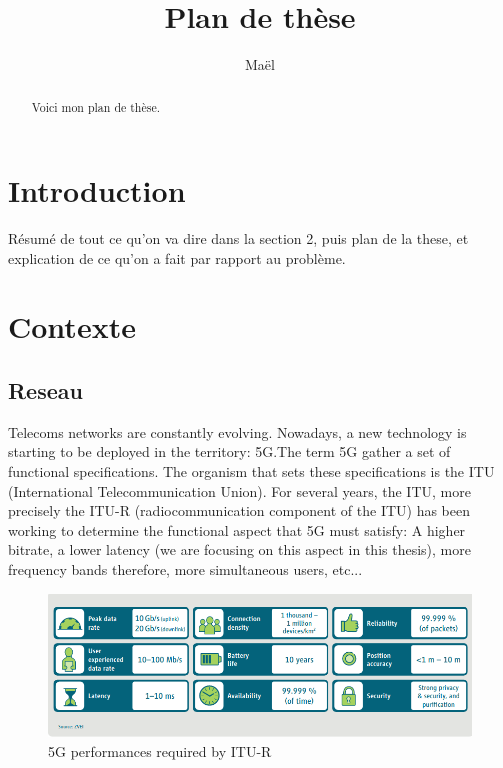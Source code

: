 \documentclass[a4paper,10pt]{article}
\title{Plan de thèse}
\author{Maël}
\begin{document}
\maketitle

\begin{abstract}
Voici mon plan de thèse.
\end{abstract}
\section{Introduction}
Résumé  de tout ce qu'on va dire dans la section 2, puis plan de la these, et explication de ce qu'on a fait par rapport au problème.

\section{Contexte}

\subsection{Reseau}
Telecoms networks are constantly evolving. Nowadays, a new technology is starting to be deployed in the territory: 5G.The term 5G gather a set of functional specifications. The organism that sets these specifications is the ITU (International Telecommunication Union). For several years, the ITU, more precisely the ITU-R (radiocommunication component of the ITU) has been working to determine the functional aspect that 5G must satisfy: A higher bitrate, a lower latency (we are focusing on this aspect in this thesis), more frequency bands therefore, more simultaneous users, etc... 

  \begin{figure}[h]
      \begin{center}
      \includegraphics[width=1\textwidth]{performance5g.png}
      \end{center}
      \caption{5G performances required by ITU-R}\label{fig:5gperf}
      \end{figure}
\end{document}
